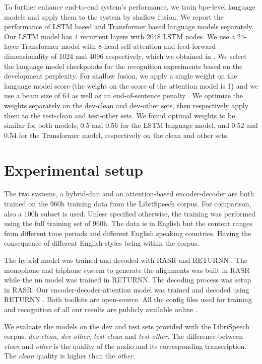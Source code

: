\documentclass[a4paper]{article}
\begin{document}
To further enhance end-to-end system's performance, we train \ac{bpe}-level language models and
apply them to the system by shallow fusion\cite{gulcehre+al-2016-monolingual, toshniwal2018comparison}.
We report the performance of LSTM based and Transformer based language models separately.
Our LSTM model has 4 recurrent layers with 2048 LSTM nodes.
We use a 24-layer Transformer model with 8-head self-attention and feed-forward dimensionality of 1024 and 4096 respectively,
which we obtained in \cite{irie:is19}.
We select the language model checkpoints for the recognition experiments based on the development perplexity.
For shallow fusion, we apply a single weight on the language model score (the weight on the score of the attention model is 1)
and we use a beam size of 64 as well as an end-of-sentence penalty \cite{hannun2019sequence}.
We optimize the weights separately on the dev-clean and dev-other sets, then respectively apply them to the test-clean and test-other sets.
We found optimal weights to be similar for both models; 0.5 and 0.56 for the LSTM language model,
and 0.52 and 0.54 for the Transformer model, respectively on the clean and other sets.


\section{Experimental setup}
\label{sec:setup}

The two systems, a hybrid-\ac{dnn} and an attention-based encoder-decoder are both trained on the 960h training data from the LibriSpeech corpus.
For comparison, also a 100h subset is used.
Unless specified otherwise, the training was performed using the full training set of 960h.
The data is in English but the content ranges from different time periods and different English speaking countries.
Having the consequence of different English styles being within the corpus.

The hybrid model was trained and decoded with RASR \cite{wiesler2014:rasr} and RETURNN \cite{zeyer2018:returnn,doetsch2017:returnn}.
The monophone and triphone system to generate the alignments was built in RASR while the \ac{nn} model was trained in RETURNN.
The decoding process was setup in RASR.
Our encoder-decoder-attention model was trained and decoded using RETURNN \cite{zeyer2018:returnn}.
Both toolkits are open-source.
All the config files used for training and recognition of all our results are publicly available online \cite{returnnexperiments2019}.

We evaluate the models on the dev and test sets provided with the LibriSpeech corpus: \emph{dev-clean}, \emph{dev-other}, \emph{test-clean} and \emph{test-other}.
The difference between \emph{clean} and \emph{other} is the quality of the audio and its corresponding transcription.
The \emph{clean} quality is higher than the \emph{other}.
\end{document}
